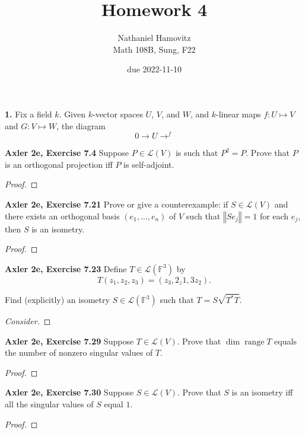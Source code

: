 \documentclass{article}
\newcommand{\F}{\mathbb{F}}
\newcommand{\paren}[1]{\left( #1 \right)}
\newcommand{\norm}[1]{\left\Vert #1 \right\Vert}
\newcommand{\lmap}[1]{\mathcal{L}\paren{#1}}
\DeclareMathOperator{\range}{range}
\begin{document}


\title{Homework 4} %
\author{Nathaniel Hamovitz\\Math 108B, Sung, F22}
\date{due 2022-11-10}

\maketitle


\textbf{1. }
Fix a field $k$. Given $k$-vector spaces $U$, $V$, and $W$, and $k$-linear maps $f: U \mapsto V$ and $G: V \mapsto W$, the diagram
$$0 \longrightarrow U \longrightarrow^{f}$$


\textbf{Axler 2e, Exercise 7.4}
Suppose $P \in \lmap{V}$ is such that $P^2 = P$. Prove that $P$ is an orthogonal projection iff $P$ is self-adjoint.
\begin{proof}
    
\end{proof}


\textbf{Axler 2e, Exercise 7.21}
Prove or give a counterexample: if $S \in \lmap{V}$ and there exists an orthogonal basis $(e_1, \dots, e_n)$ of $V$ such that $\norm{S e_j} = 1$ for each $e_j$, then $S$ is an isometry.
\begin{proof}%
    
\end{proof}


\textbf{Axler 2e, Exercise 7.23}
Define $T \in \lmap{\F^3}$ by
$$T(z_1, z_2, z_3) = (z_3, 2_z1, 3z_2).$$

Find (explicitly) an isometry $S \in \lmap{\F^3}$ such that $T = S\sqrt{T^* T}$.

\begin{proof}[Consider]
    
\end{proof}


\textbf{Axler 2e, Exercise 7.29}
Suppose $T \in \lmap{V}$. Prove that $\dim \range T$ equals the number of nonzero singular values of $T$.

\begin{proof}
    
\end{proof}


\textbf{Axler 2e, Exercise 7.30}
Suppose $S \in \lmap{V}$. Prove that $S$ is an isometry iff all the singular values of $S$ equal $1$.

\begin{proof}
    
\end{proof}
\end{document}
